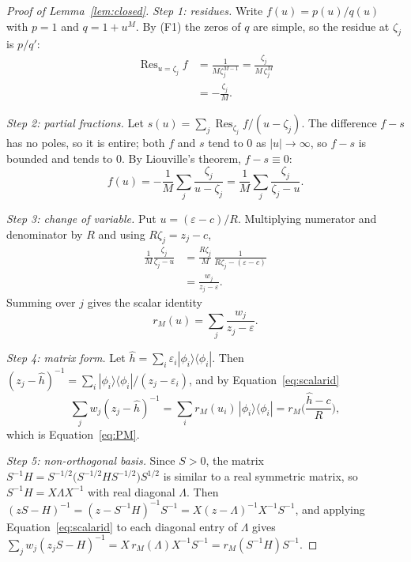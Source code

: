 \documentclass[aps,prb,twocolumn,superscriptaddress,floatfix,longbibliography]{revtex4-2}
\theoremstyle{remark}
\begin{document}
\begin{proof}[Proof of Lemma~\ref{lem:closed}]
\emph{Step 1: residues.} Write $f(u)=p(u)/q(u)$ with $p=1$ and $q=1+u^M$. By (F1) the zeros of $q$ are simple, so the
residue at $\zeta_j$ is $p/q'$:
\begin{align}
\operatorname{Res}_{u=\zeta_j}f
&=\frac{1}{M\zeta_j^{M-1}}
 =\frac{\zeta_j}{M\,\zeta_j^{M}}\nonumber\\
&=-\frac{\zeta_j}{M}.
\end{align}

\emph{Step 2: partial fractions.} Let $s(u)=\sum_j\operatorname{Res}_{\zeta_j}f/(u-\zeta_j)$. The difference $f-s$ has no
poles, so it is entire; both $f$ and $s$ tend to $0$ as $|u|\to\infty$, so $f-s$ is bounded and tends to $0$. By
Liouville's theorem, $f-s\equiv0$:
\begin{equation}
f(u)=-\frac1M\sum_j\frac{\zeta_j}{u-\zeta_j}=\frac1M\sum_j\frac{\zeta_j}{\zeta_j-u}.
\end{equation}

\emph{Step 3: change of variable.} Put $u=(\varepsilon-c)/R$. Multiplying numerator and denominator by $R$ and using
$R\zeta_j=z_j-c$,
\begin{align}
\frac{1}{M}\frac{\zeta_j}{\zeta_j-u}
&=\frac{R\zeta_j}{M}\,\frac{1}{R\zeta_j-(\varepsilon-c)}\nonumber\\
&=\frac{w_j}{z_j-\varepsilon}.
\end{align}
Summing over $j$ gives the scalar identity
\begin{equation}
r_M(u)=\sum_j\frac{w_j}{z_j-\varepsilon}.
\label{eq:scalarid}
\end{equation}

\emph{Step 4: matrix form.} Let $\hat h=\sum_i\varepsilon_i|\phi_i\rangle\langle\phi_i|$. Then
$(z_j-\hat h)^{-1}=\sum_i|\phi_i\rangle\langle\phi_i|/(z_j-\varepsilon_i)$, and by Equation~\eqref{eq:scalarid}
\begin{equation}
\sum_jw_j(z_j-\hat h)^{-1}=\sum_ir_M(u_i)\,|\phi_i\rangle\langle\phi_i|=r_M\Big(\frac{\hat h-c}{R}\Big),
\end{equation}
which is Equation~\eqref{eq:PM}.

\emph{Step 5: non-orthogonal basis.} Since $S>0$, the matrix $S^{-1}H=S^{-1/2}\big(S^{-1/2}HS^{-1/2}\big)S^{1/2}$ is similar
to a real symmetric matrix, so $S^{-1}H=X\Lambda X^{-1}$ with real diagonal $\Lambda$. Then
$(zS-H)^{-1}=(z-S^{-1}H)^{-1}S^{-1}=X(z-\Lambda)^{-1}X^{-1}S^{-1}$, and applying Equation~\eqref{eq:scalarid} to each diagonal
entry of $\Lambda$ gives $\sum_jw_j(z_jS-H)^{-1}=X\,r_M(\Lambda)X^{-1}S^{-1}=r_M(S^{-1}H)S^{-1}$.
\end{proof}
\end{document}
